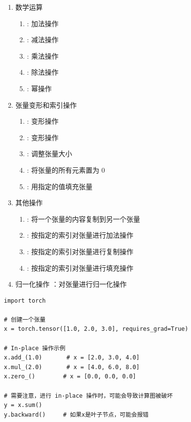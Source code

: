 \begin{enumerate}[label=\arabic*)]
        \item 数学运算
        \begin{enumerate}[itemindent=1em,label=\arabic*)]
                \item {}: 加法操作
                \item {}: 减法操作
                \item {}: 乘法操作
                \item {}: 除法操作
                \item {}: 幂操作
        \end{enumerate}
    
        \item 张量变形和索引操作
        \begin{enumerate}[itemindent=1em,label=\arabic*)]
                \item {}: 变形操作
                \item {}: 变形操作
                \item {}: 调整张量大小
                \item {}: 将张量的所有元素置为 0
                \item {}: 用指定的值填充张量
        \end{enumerate}
    
        \item 其他操作
        \begin{enumerate}[itemindent=1em,label=\arabic*)]
                \item {}: 将一个张量的内容复制到另一个张量
                \item {}: 按指定的索引对张量进行加法操作
                \item {}: 按指定的索引对张量进行复制操作
                \item {}: 按指定的索引对张量进行填充操作
        \end{enumerate}
    
        \item 归一化操作
        ：对张量进行归一化操作
\end{enumerate}


\begin{lstlisting}[style=pythonstyle]
import torch

# 创建一个张量
x = torch.tensor([1.0, 2.0, 3.0], requires_grad=True)

# In-place 操作示例
x.add_(1.0)       # x = [2.0, 3.0, 4.0]
x.mul_(2.0)       # x = [4.0, 6.0, 8.0]
x.zero_()        # x = [0.0, 0.0, 0.0]

# 需要注意，进行 in-place 操作时，可能会导致计算图被破坏
y = x.sum()
y.backward()     # 如果x是叶子节点，可能会报错
\end{lstlisting}

